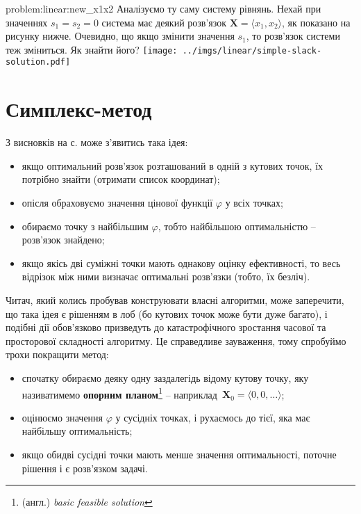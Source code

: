\documentclass[\main/book.tex]{subfiles}
\begin{document}
\begin{problem}{problem:linear:new_x1x2}
 Аналізуємо ту саму систему рівнянь. Нехай при значеннях $s_1 = s_2 = 0$ система має деякий розв'язок $\mathbf{X} = \langle x_1, x_2 \rangle$, як показано на рисунку нижче. Очевидно, що якщо змінити значення $s_1$, то розв'язок системи теж зміниться. Як знайти його?
 \center
 \texttt{[image: ../imgs/linear/simple-slack-solution.pdf]}
\end{problem}

\section{Симплекс-метод}
\label{section:linear:simplex}

З висновків на с. \pageref{conclusion:linear:optimal_solution} може з'явитись така ідея:

\begin{itemize}
 \item якщо оптимальний розв'язок розташований в одній з кутових точок, їх потрібно знайти (отримати список координат);
 \item опісля обраховуємо значення цінової функції $\varphi$ у всіх точках;
 \item обираємо точку з найбільшим $\varphi$, тобто найбільшою оптимальністю -- розв'язок знайдено;
 \item якщо якісь дві суміжні точки мають однакову оцінку ефективності, то весь відрізок між ними визначає оптимальні розв'язки (тобто, їх безліч).
\end{itemize}

Читач, який колись пробував конструювати власні алгоритми, може заперечити, що така ідея є рішенням \flqq{}в лоб\frqq{} (бо кутових точок може бути дуже багато), і подібні дії обов'язково призведуть до катастрофічного зростання часової та просторової складності алгоритму. Це справедливе зауваження, тому спробуймо трохи покращити метод:

\begin{itemize}
 \item спочатку обираємо деяку одну заздалегідь відому кутову точку, яку називатимемо \textbf{опорним планом}\footnote{(англ.) \textit{basic feasible solution}} -- наприклад~$\mathbf{X}_0 = {\langle 0, 0, \ldots \rangle}$;
 \item оцінюємо значення $\varphi$ у сусідніх точках, і рухаємось до тієї, яка має найбільшу оптимальність;
 \item якщо обидві сусідні точки мають менше значення оптимальності, поточне рішення і є розв'язком задачі.
\end{itemize}
\end{document}
